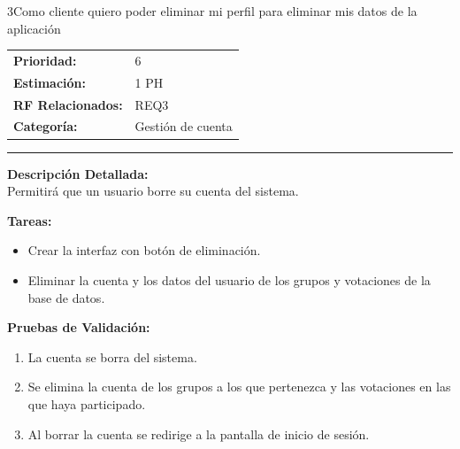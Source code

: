 \begin{hu_card}{3}{Como cliente quiero poder eliminar mi perfil para eliminar mis datos de la aplicación}
    \begin{tabularx}{\linewidth}{l X}
        \textbf{Prioridad:}   & 6 \\
        \textbf{Estimación:}  & 1 PH \\
        \textbf{RF Relacionados:} & REQ3 \\
        \textbf{Categoría:} & Gestión de cuenta \\
    \end{tabularx}

    \vspace{2mm}
    \hrule
    \vspace{2mm}

    \textbf{Descripción Detallada:} \\
    Permitirá que un usuario borre su cuenta del sistema.

    \vspace{2mm}
    \textbf{Tareas:}
    \begin{itemize}[noitemsep, topsep=0pt]
        \item Crear la interfaz con botón de eliminación.
        \item Eliminar la cuenta y los datos del usuario de los grupos y votaciones de la base de datos.
    \end{itemize}

    \vspace{2mm}
    \textbf{Pruebas de Validación:}
    \begin{enumerate}[noitemsep, topsep=0pt]
        \item La cuenta se borra del sistema.
        \item Se elimina la cuenta de los grupos a los que pertenezca y las votaciones en las que haya participado. 
        \item Al borrar la cuenta se redirige a la pantalla de inicio de sesión.
    \end{enumerate}
\end{hu_card}

